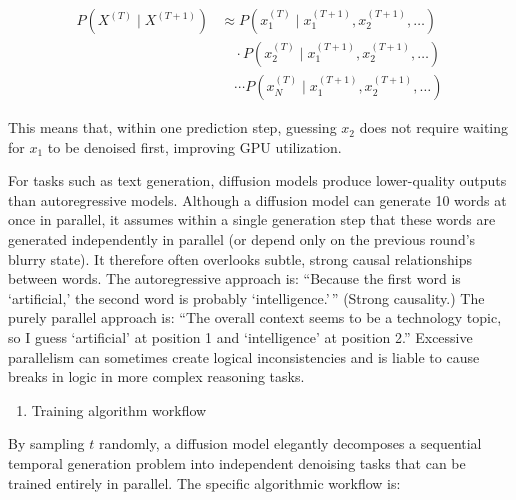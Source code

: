 \[
\begin{aligned}
P(X^{(T)} \mid X^{(T+1)})
&\approx
P(x_1^{(T)} \mid x_1^{(T+1)},x_2^{(T+1)},\ldots) \\
&\quad \cdot P(x_2^{(T)} \mid x_1^{(T+1)},x_2^{(T+1)},\ldots) \\
&\quad \cdots
P(x_N^{(T)} \mid x_1^{(T+1)},x_2^{(T+1)},\ldots)
\end{aligned}
\]

This means that, within one prediction step, guessing \(x_2\) does not require waiting for \(x_1\) to be denoised first, improving GPU utilization.

For tasks such as text generation, diffusion models produce lower-quality outputs than autoregressive models. Although a diffusion model can generate 10 words at once in parallel, it assumes within a single generation step that these words are generated independently in parallel (or depend only on the previous round's blurry state). It therefore often overlooks subtle, strong causal relationships between words. The autoregressive approach is: ``Because the first word is `artificial,' the second word is probably `intelligence.'\,'' (Strong causality.) The purely parallel approach is: ``The overall context seems to be a technology topic, so I guess `artificial' at position 1 and `intelligence' at position 2.'' Excessive parallelism can sometimes create logical inconsistencies and is liable to cause breaks in logic in more complex reasoning tasks.

\begin{enumerate}
\def\labelenumi{\arabic{enumi}.}
\setcounter{enumi}{2}
\tightlist
\item
  Training algorithm workflow
\end{enumerate}

By sampling \(t\) randomly, a diffusion model elegantly decomposes a sequential temporal generation problem into independent denoising tasks that can be trained entirely in parallel. The specific algorithmic workflow is:

